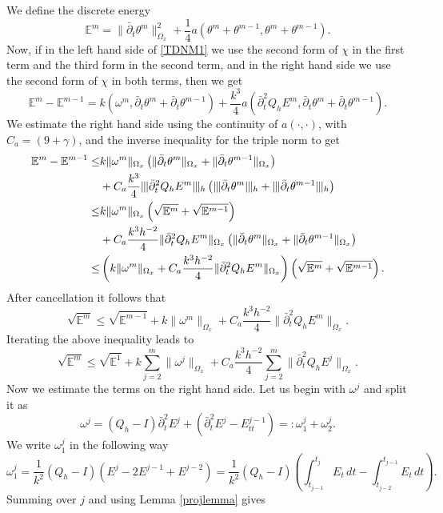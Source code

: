 \documentclass[reqno,a4paper]{amsart}
\theoremstyle{remark}
\numberwithin{equation}{section}
\newcommand{\norm}[1]{\|#1\|}
\newcommand{\Tnorm}[1]{|\mkern-1mu|\mkern-1mu|#1|\mkern-1mu|\mkern-1mu|}
\def\dbart{\bar{\partial}_t}
\def\dbartt{\bar{\partial}_t^2}
\def\bbE{\mathbb{E}}
\begin{document}
We define the discrete energy
\[
\bbE^m = \norm{\dbart \theta^m}^2_{\Omega_x} + 
\frac{1}{4} a(\theta^m + \theta^{m - 1}, \theta^m + \theta^{m - 1}).
\]
Now, if in the left hand side of \eqref{TDNM1}
we use the second form of $ \chi $ in the first term and the third form in the second term,
and in the right hand side we use the second form of $ \chi $ in both terms, then we get
\[
\bbE^m - \bbE^{m - 1} = k ( \omega^m, \dbart \theta^m + \dbart \theta^{m - 1})
+ \frac{k^3}{4} a(\dbartt Q_h E^m, \dbart \theta^m + \dbart \theta^{m - 1}).
\]
We estimate the right hand side
using the continuity of $a(\cdot, \cdot)$, with $C_a=(9+\gamma)$,
and the inverse inequality for the triple norm to get
\[
\begin{aligned}
\bbE^m - \bbE^{m-1} \leq & k \norm{\omega^m}_{\Omega_x} \left( \norm{\dbart \theta^m}_{\Omega_x} 
+ \norm{\dbart \theta^{m - 1}}_{\Omega_x} \right)\\
&+ C_a\frac{k^3}{4} \Tnorm{\dbartt Q_h E^m}_h \left( \Tnorm{\dbart \theta^m}_h + \Tnorm{\dbart \theta^{m - 1}}_h \right) \\
\leq & k \norm{\omega^m}_{\Omega_x} \left( \sqrt{\bbE^m} + \sqrt{\bbE^{m - 1}} \right)\\
&+ C_a\frac{k^3 h^{-2}}{4} \norm{\dbartt Q_h E^m}_{\Omega_x}
\left( \norm{\dbart \theta^m}_{\Omega_x} + \norm{\dbart \theta^{m - 1}}_{\Omega_x} \right) \\
\leq& \left( k \norm{\omega^m}_{\Omega_x} + C_a\frac{k^3 h^{-2}}{4}
 \norm{\dbartt Q_h E^m}_{\Omega_x} \right) \left( \sqrt{\bbE^m} + \sqrt{\bbE^{m - 1}} \right).
\end{aligned}
\]
After cancellation it follows that
\[
\sqrt{\bbE^m} \leq \sqrt{\bbE^{m - 1}} + k \norm{\omega^m}_{\Omega_x}
+ C_a\frac{k^3 h^{-2}}{4} \norm{\dbartt Q_h E^m}_{\Omega_x}.
\]
Iterating the above inequality leads to
\begin{equation} \label{TDNM2}
\sqrt{\bbE^m} \leq \sqrt{\bbE^1} + k \sum_{j = 2}^m \norm{\omega^j}_{\Omega_x} + 
C_a\frac{k^3 h^{-2}}{4} \sum_{j = 2}^m \norm{\dbartt Q_h E^j}_{\Omega_x}.
\end{equation}
Now we estimate the terms on the right hand side.
Let us begin with $ \omega^j $ and split it as
\[
\omega^j = (Q_h - I) \dbartt E^j + (\dbartt E^j - E_{tt}^{j-1}) =: 
\omega_1^j + \omega_2^j.
\]
We write $ \omega_1^j $ in the following way
\[
\omega_1^j = \frac{1}{k^2} (Q_h - I) (E^j - 2 E^{j - 1} + E^{j - 2}) = 
\frac{1}{k^2} (Q_h - I) \left( \int_{t_{j - 1}}^{t_j} E_t \, dt - 
\int_{t_{j - 2}}^{t_{j - 1}} E_t \, dt \right).
\]
Summing over $ j $ and using Lemma \ref{projlemma} gives
\end{document}
